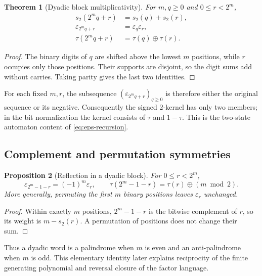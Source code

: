 \documentclass[11pt,oneside]{article}
\newtheorem{theorem}{Theorem}[section]
\newtheorem{proposition}[theorem]{Proposition}
\theoremstyle{definition}
\theoremstyle{remark}
\newcommand{\wt}{s_2}
\newcommand{\eps}{\varepsilon}
\newcommand{\xor}{\mathbin{\oplus}}
\begin{document}
\begin{theorem}[Dyadic block multiplicativity]
\label{thm:block-multiplicativity}
For \(m,q\ge0\) and \(0\le r<2^m\),
\begin{align}
  \wt(2^m q+r)&=\wt(q)+\wt(r),                              \label{eq:weight-block}\\
  \eps_{2^m q+r}&=\eps_q\eps_r,                             \label{eq:eps-block}\\
  \tau(2^m q+r)&=\tau(q)\xor\tau(r).                       \label{eq:tau-block}
\end{align}
\end{theorem}

\begin{proof}
The binary digits of \(q\) are shifted above the lowest \(m\) positions, while \(r\) occupies
only those positions.  Their supports are disjoint, so the digit sums add without carries.
Taking parity gives the last two identities.
\end{proof}

For each fixed \(m,r\), the subsequence \((\eps_{2^m q+r})_{q\ge0}\) is therefore either the
original sequence or its negative.  Consequently the signed \(2\)-kernel has only two
members; in the bit normalization the kernel consists of \(\tau\) and \(1-\tau\).  This is
the two-state automaton content of \eqref{eq:eps-recursion}.

\subsection{Complement and permutation symmetries}

\begin{proposition}[Reflection in a dyadic block]
\label{prop:block-reflection}
For \(0\le r<2^m\),
\begin{equation}
  \eps_{2^m-1-r}=(-1)^m\eps_r,
  \qquad
  \tau(2^m-1-r)=\tau(r)\xor(m\bmod2).                       \label{eq:block-reflection}
\end{equation}
More generally, permuting the first \(m\) binary positions leaves \(\eps_r\) unchanged.
\end{proposition}

\begin{proof}
Within exactly \(m\) positions, \(2^m-1-r\) is the bitwise complement of \(r\), so its
weight is \(m-\wt(r)\).  A permutation of positions does not change their sum.
\end{proof}

Thus a dyadic word is a palindrome when \(m\) is even and an anti-palindrome when \(m\) is
odd.  This elementary identity later explains reciprocity of the finite generating
polynomial and reversal closure of the factor language.
\end{document}
